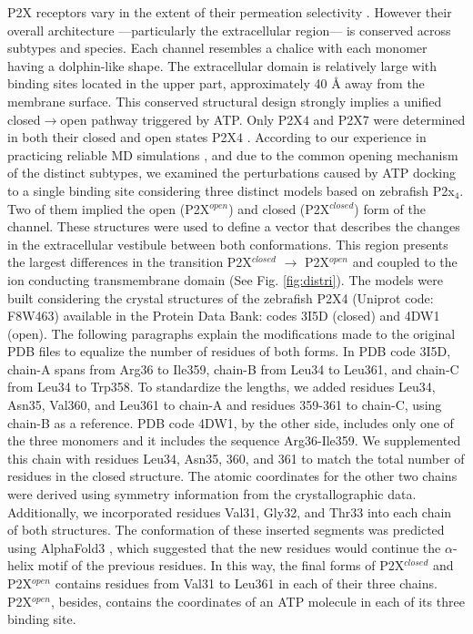 \documentclass[9pt]{elife}
\begin{document}
	
	P2X receptors vary in the extent of their permeation selectivity \cite{samways2014principles}. However their overall architecture —particularly the extracellular region— is conserved across subtypes and species. 
	Each channel resembles a chalice with each monomer having a dolphin-like shape. The extracellular domain is relatively large with binding sites located in the upper part, approximately 40 Å away from the membrane surface.
	This conserved structural design strongly implies a unified closed$\rightarrow$open pathway triggered by ATP.
	Only P2X${4}$ and P2X${7}$ were determined in both their closed and open states P2X${4}$ \cite{abierta_p2x,cerrada_p2x,mccarthy2019full,karasawa2016,sheng2024structural}. According to our experience in practicing reliable MD simulations \cite{piedominici_p2x_1,racigh2021, pierdominici2019charge,racigh2019positively}, and due to the common opening mechanism of the distinct subtypes, we examined the perturbations caused by ATP docking to a single binding site considering three distinct models based on zebrafish P2x${_4}$. Two of them implied the open (P2X$^{open}$) and closed (P2X$^{closed}$) form of the channel. These structures were used to define a vector that describes the changes in the extracellular vestibule between both conformations. This region
	presents the largest differences in the transition P2X$^{closed}$ $\xrightarrow{}$ P2X$^{open}$ \cite{abierta_p2x} and coupled to the ion conducting transmembrane domain  (See Fig. \ref{fig:distri}). 
	The models were built considering the crystal structures of the zebrafish P2X4 (Uniprot code: F8W463) available in the Protein Data Bank: codes 3I5D (closed) and 4DW1 (open). The following paragraphs explain the modifications made to the original PDB files to equalize the number of residues of both forms.
	In PDB code 3I5D, chain-A spans from Arg36 to Ile359, chain-B from Leu34 to Leu361, and chain-C from Leu34 to Trp358. To standardize the lengths, we added residues Leu34, Asn35, Val360, and Leu361 to chain-A and residues 359-361 to chain-C, using chain-B as a reference. PDB code 4DW1, by the other side, includes only one of the three monomers and it includes the sequence Arg36-Ile359. We supplemented this chain with residues Leu34, Asn35, 360, and 361 to match the total number of residues in the closed structure. The atomic coordinates for the other two chains were derived using symmetry information from the crystallographic data.
	Additionally, we incorporated residues Val31, Gly32, and Thr33 into each chain of both structures. The conformation of these inserted segments was predicted using AlphaFold3 \cite{af3}, which suggested that the new residues would continue the $\alpha$-helix motif of the previous residues.
	In this way, the final forms of P2X$^{closed}$ and P2X$^{open}$ contains residues from Val31 to Leu361 in each of their three chains. P2X$^{open}$, besides, contains the coordinates of an ATP molecule in each of its three binding site.
	
\end{document}
